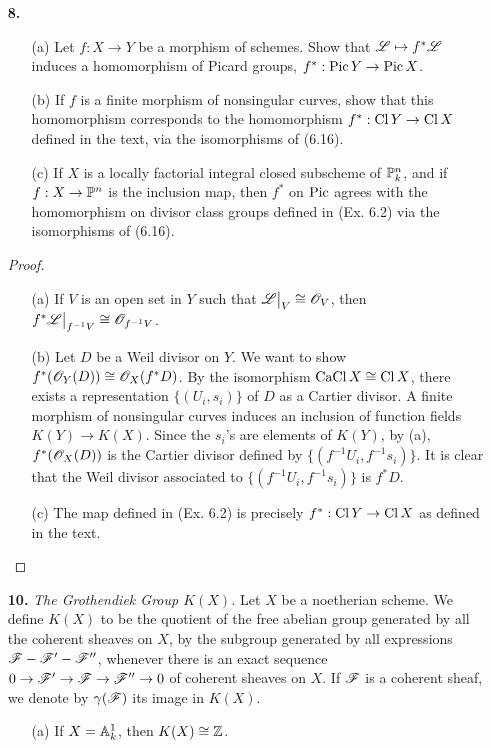 \documentclass{article}
\begin{document}
\begin{enumerate} [label=\textbf{\arabic*.}, leftmargin=0em]
\item[\textbf{8.}]
\begin{itemize}
    \item[(a)] Let $f : X \to Y$ be a morphism of schemes. Show that $\mathscr{L} \mapsto f^* \mathscr{L}$ induces a homomorphism of Picard groups, $f^* : \operatorname{Pic} Y \to \operatorname{Pic} X$.

    \item[(b)] If $f$ is a finite morphism of nonsingular curves, show that this homomorphism corresponds to the homomorphism $f^* : \operatorname{Cl} Y \to \operatorname{Cl} X$ defined in the text, via the isomorphisms of (6.16).

    \item[(c)] If $X$ is a locally factorial integral closed subscheme of $\mathbb{P}_k^n$, and if $f : X \to \mathbb{P}^n$ is the inclusion map, then $f^*$ on $\operatorname{Pic}$ agrees with the homomorphism on divisor class groups defined in (Ex. 6.2) via the isomorphisms of (6.16).
\end{itemize}

\begin{proof} $ $ \vspace{0pt}
\begin{itemize} [leftmargin=0cm]
\item[(a)] If $V$ is an open set in $Y$ such that $\restr{\fL}{V} \cong \fO_V$, then $\restr{f^*\fL}{f^{-1}V} \cong \fO_{f^{-1}V}$.

\item[(b)] Let $D$ be a Weil divisor on $Y$. We want to show $f^* (\mathscr{O}_Y(D)) \cong \mathscr{O}_X(f^*D)$. By the isomorphism $\operatorname{CaCl}{X} \cong \operatorname{Cl}{X}$, there exists a representation $\{ (U_i, s_i) \}$ of $D$ as a Cartier divisor.
A finite morphism of nonsingular curves induces an inclusion of function fields $K(Y) \to K(X)$.
Since the $s_i$'s are elements of $K(Y)$, by (a), $f^*(\mathscr{O}_X(D))$ is the Cartier divisor defined by $\{ (f^{-1}U_i, f^{-1}s_i)\}$.
It is clear that the Weil divisor associated to $\{ (f^{-1}U_i, f^{-1}s_i)\}$ is $f^* D$. 

\item[(c)] The map defined in (Ex. 6.2) is precisely $f^* : \operatorname{Cl}{Y} \to \operatorname{Cl}{X}$ as defined in the text.
\end{itemize} 
\end{proof}

\item[\textbf{10.}] \textit{The Grothendiek Group $K(X)$.} Let $X$ be a noetherian scheme. We define $K(X)$ to be the quotient of the free abelian group generated by all the coherent sheaves on $X$, by the subgroup generated by all expressions $\mathscr{F} - \mathscr{F}' - \mathscr{F}''$, whenever there is an exact sequence $0 \to \mathscr{F}' \to \mathscr{F} \to \mathscr{F}'' \to 0$ of coherent sheaves on $X$. If $\mathscr{F}$ is a coherent sheaf, we denote by $\gamma(\mathscr{F})$ its image in $K(X)$.
\begin{itemize}
    \item[(a)] If $X = \mathbb{A}_k^1$, then $K(X) \cong \mathbb{Z}$.


\end{itemize}
\end{enumerate}
\end{document}
